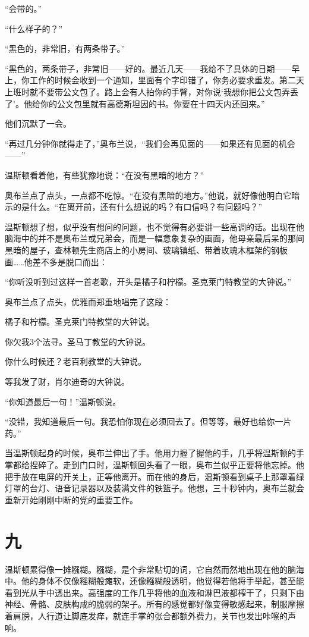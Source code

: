 ``会带的。''

``什么样子的？''

``黑色的，非常旧，有两条带子。''

``黑色的，两条带子，非常旧——好的。最近几天——我给不了具体的日期——早上，你工作的时候会收到一个通知，里面有个字印错了，你务必要求重发。第二天上班时就不要带公文包了。路上会有人拍你的手臂，对你说`我想你把公文包弄丢了'。他给你的公文包里就有高德斯坦因的书。你要在十四天内还回来。''

他们沉默了一会。

``再过几分钟你就得走了，''奥布兰说，``我们会再见面的——如果还有见面的机会——''

温斯顿看着他，有些犹豫地说：``在没有黑暗的地方？''

奥布兰点了点头，一点都不吃惊。``在没有黑暗的地方。''他说，就好像他明白它暗示的是什么。``在离开前，还有什么想说的吗？有口信吗？有问题吗？''

温斯顿想了想，似乎没有想问的问题，也不觉得有必要讲一些高调的话。出现在他脑海中的并不是奥布兰或兄弟会，而是一幅意象复杂的画面，他母亲最后呆的那间黑暗的屋子，查林顿先生商店上的小房间、玻璃镇纸、带着玫瑰木框架的钢板画\ldots\ldots 他差不多是脱口而出：

``你听没听到过这样一首老歌，开头是橘子和柠檬。圣克莱门特教堂的大钟说。''

奥布兰点了点头，优雅而郑重地唱完了这段：

橘子和柠檬。圣克莱门特教堂的大钟说。

你欠我3个法寻。圣马丁教堂的大钟说。

你什么时候还？老百利教堂的大钟说。

等我发了财，肖尔迪奇的大钟说。

``你知道最后一句！''温斯顿说。

``没错，我知道最后一句。我恐怕你现在必须回去了。但等等，最好也给你一片药。''

当温斯顿起身的时候，奥布兰伸出了手。他用力握了握他的手，几乎将温斯顿的手掌都给捏碎了。走到门口时，温斯顿回头看了一眼，奥布兰似乎正要将他忘掉。他把手放在电屏的开关上，正等他离开。而在他的身后，温斯顿看到桌子上那罩着绿灯罩的台灯、语音记录器以及装满文件的铁篮子。他想，三十秒钟内，奥布兰就会重新开始刚刚中断的党的重要工作。

\section*{九}\label{ux5341ux4e03}

温斯顿累得像一摊糨糊。糨糊，是个非常贴切的词，它自然而然地出现在他的脑海中。他的身体不仅像糨糊般瘫软，还像糨糊般透明，他觉得若他将手举起，甚至能看到光从手中透出来。高强度的工作几乎将他的血液和淋巴液都榨干了，只剩下由神经、骨骼、皮肤构成的脆弱的架子。所有的感觉都好像变得敏感起来，制服摩擦着肩膀，人行道让脚底发痒，就连手掌的张合都额外费力，关节也发出咔嚓的声响。

